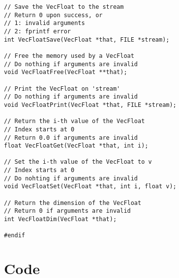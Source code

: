 \documentclass[12pt, a4paper]{article}
\begin{document}
\begin{scriptsize}
\begin{ttfamily}
\begin{lstlisting}
// Save the VecFloat to the stream
// Return 0 upon success, or
// 1: invalid arguments
// 2: fprintf error
int VecFloatSave(VecFloat *that, FILE *stream);

// Free the memory used by a VecFloat
// Do nothing if arguments are invalid
void VecFloatFree(VecFloat **that);

// Print the VecFloat on 'stream'
// Do nothing if arguments are invalid
void VecFloatPrint(VecFloat *that, FILE *stream);

// Return the i-th value of the VecFloat
// Index starts at 0
// Return 0.0 if arguments are invalid
float VecFloatGet(VecFloat *that, int i);

// Set the i-th value of the VecFloat to v
// Index starts at 0
// Do nohting if arguments are invalid
void VecFloatSet(VecFloat *that, int i, float v);

// Return the dimension of the VecFloat
// Return 0 if arguments are invalid
int VecFloatDim(VecFloat *that);

#endif
\end{lstlisting}
\end{ttfamily}
\end{scriptsize}

\section{Code}
\end{document}
